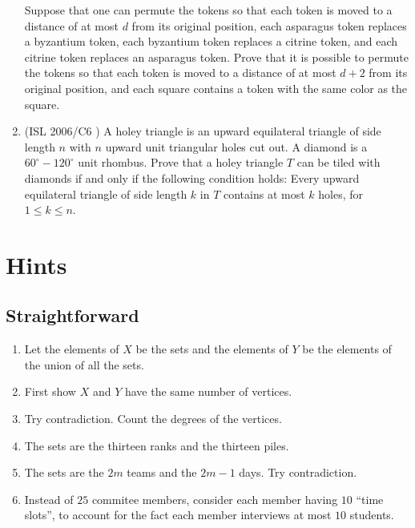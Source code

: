 \documentclass[11pt,paper=letter]{scrartcl}
\begin{document}
\begin{enumerate}
Suppose that one can permute the tokens so that each token is moved to a distance of at most $d$ from its original position, each asparagus token replaces a byzantium token, each byzantium token replaces a citrine token, and each citrine token replaces an asparagus token. Prove that it is possible to permute the tokens so that each token is moved to a distance of at most $d + 2$ from its original position, and each square contains a token with the same color as the square.

\item (ISL 2006/C6 \cite{islc6}) A holey triangle is an upward equilateral triangle of side length $n$ with $n$ upward unit triangular holes cut out. A diamond is a $60^\circ-120^\circ$ unit rhombus. Prove that a holey triangle $T$ can be tiled with diamonds if and only if the following condition holds: Every upward equilateral triangle of side length $k$ in $T$ contains at most $k$ holes, for $1\leq k\leq n$.

\end{enumerate}

\newpage

\section{Hints}

\subsection{Straightforward}

\begin{enumerate}

\item Let the elements of $X$ be the sets and the elements of $Y$ be the elements of the union of all the sets.

\item First show $X$ and $Y$ have the same number of vertices.

\item Try contradiction. Count the degrees of the vertices.

\item The sets are the thirteen ranks and the thirteen piles.

\item The sets are the $2m$ teams and the $2m-1$ days. Try contradiction.

\item Instead of $25$ commitee members, consider each member having $10$ ``time slots'', to account for the fact each member interviews at most $10$ students.

\end{enumerate}
\end{document}
